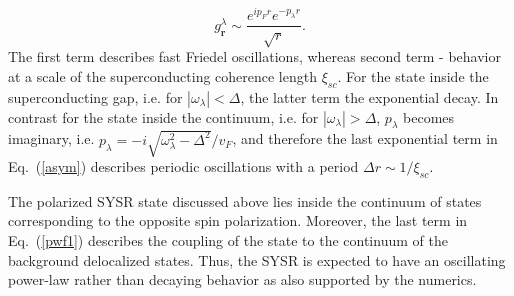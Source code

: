 \documentclass[twocolumn,showpacs,floatfix,nofootinbib,longbibliography]{revtex4-1}
\begin{document}
\begin{equation}
	g^{\lambda}_{\bm r} \sim \frac{e^{i p_F r}e^{-p_\lambda r}}{\sqrt r}. \label{asym}
\end{equation}
The first term describes fast Friedel oscillations, whereas second term - behavior at a scale of the superconducting coherence length $\xi_{sc}$. For the state inside the superconducting gap, i.e. for $|\omega_\lambda|<\Delta$, the latter term the exponential decay. In contrast for the state inside the continuum, i.e. for $|\omega_\lambda|>\Delta$, $p_\lambda$ becomes imaginary, i.e. $p_\lambda = -i\sqrt{\omega^2_\lambda-\Delta^2}/v_F$, and therefore the last exponential term in Eq.~(\ref{asym}) describes periodic oscillations with a period $\Delta r \sim 1/\xi_{sc}$. 

The polarized SYSR state discussed above lies inside the continuum of states corresponding to the opposite spin polarization. Moreover, the last term in Eq.~(\ref{pwf1}) describes the coupling of the state to the continuum of the background delocalized states. Thus, the SYSR is expected to have an oscillating power-law rather than decaying behavior as also supported by the numerics. 
\end{document}
